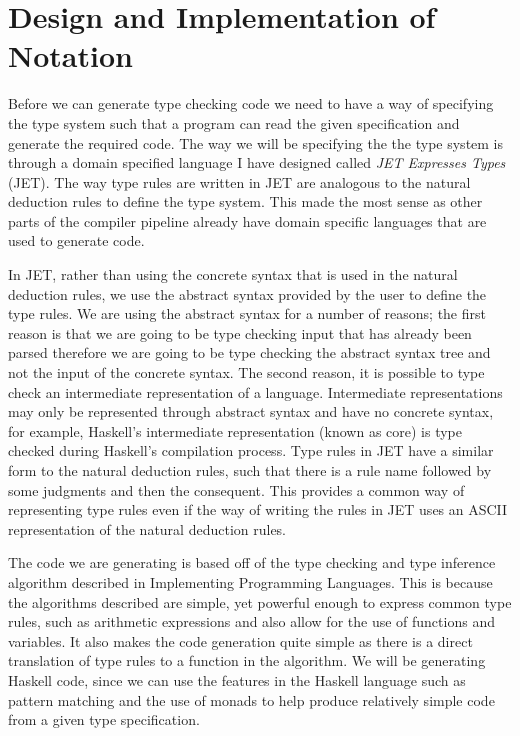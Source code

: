 \chapter{Design and Implementation of Notation}
\label{chap:Method}
Before we can generate type checking code we need to have a way of specifying the type system such that a program can read the given specification and generate the required code.
The way we will be specifying the the type system is through a domain specified language I have designed called \textit{JET Expresses Types} (JET).
The way type rules are written in JET are analogous to the natural deduction rules to define the type system.
This made the most sense as other parts of the compiler pipeline already have domain specific languages that are used to generate code.

In JET, rather than using the concrete syntax that is used in the natural deduction rules, we use the abstract syntax provided by the user to define the type rules.
We are using the abstract syntax for a number of reasons; the first reason is that we are going to be type checking input that has already been parsed therefore we are going to be type checking the abstract syntax tree and not the input of the concrete syntax.
The second reason, it is possible to type check an intermediate representation of a language.
Intermediate representations may only be represented through abstract syntax and have no concrete syntax, for example, Haskell's intermediate representation (known as core) is type checked during Haskell's compilation process\cite{marlow2004glasgow}.
Type rules in JET have a similar form to the natural deduction rules, such that there is a rule name followed by some judgments and then the consequent.
This provides a common way of representing type rules even if the way of writing the rules in JET uses an ASCII representation of the natural deduction rules.

The code we are generating is based off of the type checking and type inference algorithm described in Implementing Programming Languages\cite{ranta2012implementing}.
This is because the algorithms described are simple, yet powerful enough to express common type rules, such as arithmetic expressions and also allow for the use of functions and variables.
It also makes the code generation quite simple as there is a direct translation of type rules to a function in the algorithm.
We will be generating Haskell code, since we can use the features in the Haskell language such as pattern matching and the use of monads to help produce relatively simple code from a given type specification.

